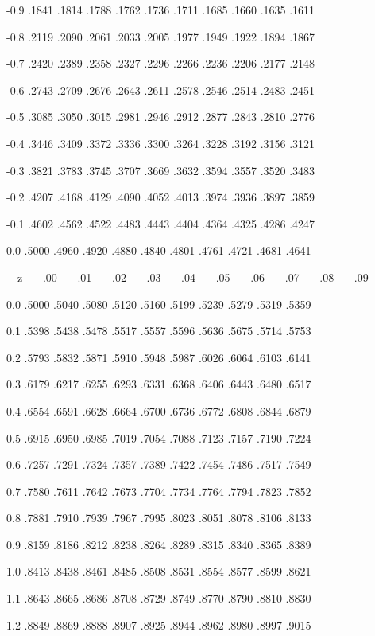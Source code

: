 \documentclass[12pt,fleqn]{article}\usepackage{../common}
\begin{document}
-0.9 .1841 .1814 .1788 .1762 .1736 .1711 .1685 .1660 .1635 .1611

-0.8 .2119 .2090 .2061 .2033 .2005 .1977 .1949 .1922 .1894 .1867

-0.7 .2420 .2389 .2358 .2327 .2296 .2266 .2236 .2206 .2177 .2148

-0.6 .2743 .2709 .2676 .2643 .2611 .2578 .2546 .2514 .2483 .2451

-0.5 .3085 .3050 .3015 .2981 .2946 .2912 .2877 .2843 .2810 .2776

-0.4 .3446 .3409 .3372 .3336 .3300 .3264 .3228 .3192 .3156 .3121

-0.3 .3821 .3783 .3745 .3707 .3669 .3632 .3594 .3557 .3520 .3483

-0.2 .4207 .4168 .4129 .4090 .4052 .4013 .3974 .3936 .3897 .3859

-0.1 .4602 .4562 .4522 .4483 .4443 .4404 .4364 .4325 .4286 .4247

0.0 .5000 .4960 .4920 .4880 .4840 .4801 .4761 .4721 .4681 .4641

\newpage

\ \ z \ \ \  .00  \ \ \ .01 \ \ \ .02 \ \ \ .03 \ \ \ .04 \ \ \ .05 \ \ \ .06 \
\ \ .07 \ \ \ .08 \ \ \ .09

0.0 .5000 .5040 .5080 .5120 .5160 .5199 .5239 .5279 .5319 .5359

0.1 .5398 .5438 .5478 .5517 .5557 .5596 .5636 .5675 .5714 .5753

0.2 .5793 .5832 .5871 .5910 .5948 .5987 .6026 .6064 .6103 .6141

0.3 .6179 .6217 .6255 .6293 .6331 .6368 .6406 .6443 .6480 .6517

0.4 .6554 .6591 .6628 .6664 .6700 .6736 .6772 .6808 .6844 .6879

0.5 .6915 .6950 .6985 .7019 .7054 .7088 .7123 .7157 .7190 .7224

0.6 .7257 .7291 .7324 .7357 .7389 .7422 .7454 .7486 .7517 .7549

0.7 .7580 .7611 .7642 .7673 .7704 .7734 .7764 .7794 .7823 .7852

0.8 .7881 .7910 .7939 .7967 .7995 .8023 .8051 .8078 .8106 .8133

0.9 .8159 .8186 .8212 .8238 .8264 .8289 .8315 .8340 .8365 .8389

1.0 .8413 .8438 .8461 .8485 .8508 .8531 .8554 .8577 .8599 .8621

1.1 .8643 .8665 .8686 .8708 .8729 .8749 .8770 .8790 .8810 .8830

1.2 .8849 .8869 .8888 .8907 .8925 .8944 .8962 .8980 .8997 .9015
\end{document}
